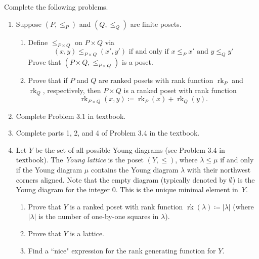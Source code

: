\documentclass[11pt]{article}%
\theoremstyle{definition}
\DeclareMathOperator{\Des}{Des}
\DeclareMathOperator{\inv}{inv}
\DeclareMathOperator{\area}{area}
\DeclareMathOperator{\rk}{rk}
\begin{document}
Complete the following problems. 
\begin{enumerate}
\item Suppose $(P,\leq_P)$ and $(Q,\leq_Q)$ are finite posets. 
\begin{enumerate}
\item Define $\leq_{P\times Q}$ on $P\times Q$ via
\[
(x,y)\leq_{P\times Q} (x',y') \text{ if and only if } x\leq_P x'\text{ and } y\leq_Q y'
\]
Prove that $(P\times Q,\leq_{P\times Q})$ is a poset.
\item Prove that if $P$ and $Q$ are ranked posets with rank function $\rk_P$ and $\rk_Q$, respectively, then $P\times Q$ is a ranked poset with rank function
\[
\rk_{P\times Q}(x,y)\coloneqq \rk_P(x)+\rk_Q(y).
\]
\end{enumerate}
\item Complete Problem 3.1 in textbook.
\item Complete parts 1, 2, and 4 of Problem 3.4 in the textbook.
\item Let $Y$ be the set of all possible Young diagrams (see Problem 3.4 in textbook). The \emph{Young lattice} is the poset $(Y,\leq)$, where $\lambda\leq \mu$ if and only if the Young diagram $\mu$ contains the Young diagram $\lambda$ with their northwest corners aligned. Note that the empty diagram (typically denoted by $\emptyset$) is the Young diagram for the integer 0. This is the unique minimal element in~$Y$.
\begin{enumerate}
\item Prove that $Y$ is a ranked poset with rank function $\rk(\lambda)\coloneqq |\lambda|$ (where $|\lambda|$ is the number of one-by-one squares in $\lambda$).
\item Prove that $Y$ is a lattice.
\item Find a ``nice" expression for the rank generating function for $Y$.
\end{enumerate}
\end{enumerate}
\end{document}
